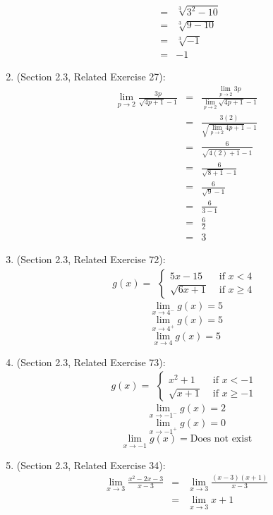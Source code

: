 \documentclass{article}
\begin{document}
\begin{enumerate}
\begin{eqnarray}
	    &=& \sqrt[3]{3^2 - 10} \\
	    &=& \sqrt[3]{9 - 10} \\
	    &=& \sqrt[3]{-1} \\
	    &=& -1
	    \end{eqnarray}
    \item (Section 2.3, Related Exercise 27):
	    \begin{eqnarray}
	    \lim_{p \to 2}{\frac{3p}{\sqrt{4p+1}-1}} &=& \frac{\lim\limits_{p \to 2}{3p}}{\lim\limits_{p \to 2}{\sqrt{4p+1}-1}} \\
	    &=& \frac{3(2)}{\sqrt{\lim\limits_{p \to 2}{4p+1}}-1} \\
	    &=& \frac{6}{\sqrt{4(2)+1}-1} \\
	    &=& \frac{6}{\sqrt{8+1}-1} \\
	    &=& \frac{6}{\sqrt{9}-1} \\
	    &=& \frac{6}{3-1} \\
	    &=& \frac{6}{2} \\
	    &=& 3
	    \end{eqnarray}
    \item (Section 2.3, Related Exercise 72):
	    $$g(x) = \begin{aligned}\begin{cases}
	    5x-15 &\text{ if } x < 4 \\
	    \sqrt{6x+1} &\text{ if } x \geq 4
	    \end{cases}\end{aligned}$$
	    $$\lim_{x \to 4^-}{g(x)} = 5$$
	    $$\lim_{x \to 4^+}{g(x)} = 5$$
	    $$\lim_{x \to 4}{g(x)} = 5$$
    \item (Section 2.3, Related Exercise 73):
        $$g(x) = \begin{aligned}
            \begin{cases}
	            x^2+1 &\text{ if } x < -1 \\
	            \sqrt{x+1} &\text{ if } x \geq -1
	        \end{cases}
        \end{aligned}$$
	    $$\lim_{x \to -1^-}{g(x)} = 2$$
	    $$\lim_{x \to -1^+}{g(x)} = 0$$
	    $$\lim_{x \to -1}{g(x)} = \text{Does not exist}$$
    \item (Section 2.3, Related Exercise 34):
	    \begin{eqnarray}
	    \lim_{x \to 3}{\frac{x^2 - 2x - 3}{x - 3}} &=& \lim_{x \to 3}{\frac{(x-3)(x+1)}{x - 3}} \\
	    &=& \lim_{x \to 3}{x+1} \\

\end{eqnarray}
\end{enumerate}
\end{document}
